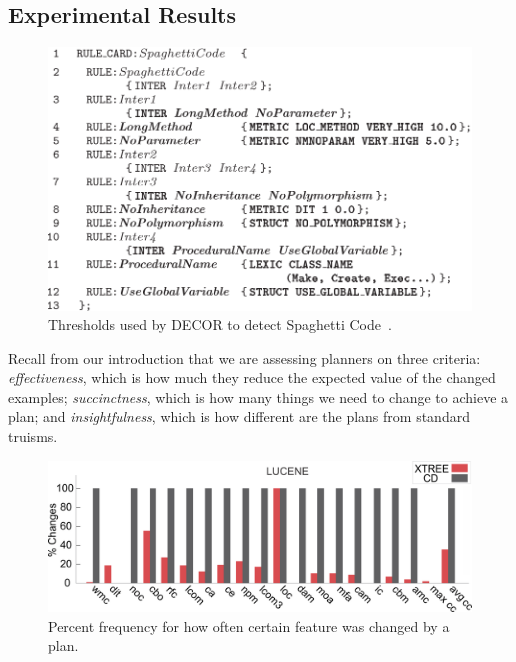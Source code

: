 \documentclass{sig-alternate}
\begin{document}


\subsection{Experimental Results}

\begin{figure}[tb!]
\centering
\includegraphics[width=\linewidth]{figs/thresh.png}
\caption{Thresholds used by DECOR to detect Spaghetti Code~\cite{moha10}.}\label{fig:thresh}
\end{figure}

 
Recall from our introduction that we are assessing planners on three criteria:
{\em effectiveness}, which is how much they reduce the expected value of the changed examples;
{\em succinctness}, which is how many things we need to change to achieve a plan;
and {\em insightfulness}, which is how different are the plans from standard truisms.

\begin{figure}[tbp!]
\centering
\includegraphics[width=\linewidth]{figs/PercentChanges.png}
\caption{Percent frequency for how often certain feature was changed by a plan.}\label{fig:changed}
\end{figure}
\end{document}
